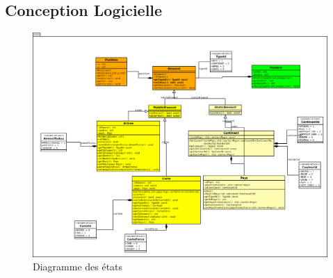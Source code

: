 \subsection{Conception Logicielle}


\newpage
\begin{landscape}
    \begin{figure}[!htbp]
        \centering
        \includegraphics[width=21cm]{Images/state.png}
        \caption{Diagramme des états}
        \label{fig:textures_plateau}
    \end{figure}
\end{landscape}